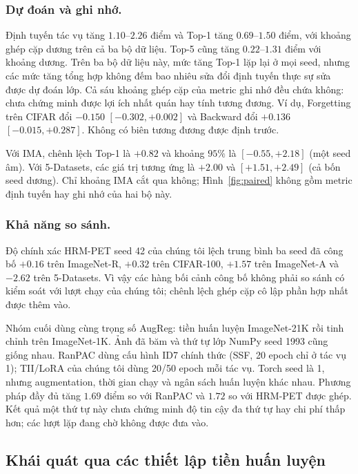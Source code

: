 \documentclass[runningheads]{llncs}
\begin{document}
\subsubsection{Dự đoán và ghi nhớ.}
Định tuyến tác vụ tăng $1.10$--$2.26$ điểm và Top-1 tăng
$0.69$--$1.50$ điểm, với khoảng ghép cặp dương trên cả ba bộ dữ liệu. Top-5
cũng tăng $0.22$--$1.31$ điểm với khoảng dương. Trên ba bộ dữ liệu này, mức
tăng Top-1 lặp lại ở mọi seed, nhưng các mức tăng tổng hợp không đếm bao nhiêu
sửa đổi định tuyến thực sự sửa được dự đoán lớp. Cả sáu khoảng ghép cặp của
metric ghi nhớ đều chứa không: chưa chứng minh được lợi ích nhất quán hay tính
tương đương. Ví dụ, Forgetting trên CIFAR đổi $-0.150$ $[-0.302,+0.002]$ và
Backward đổi $+0.136$ $[-0.015,+0.287]$. Không có biên tương đương được định trước.

Với IMA, chênh lệch Top-1 là $+0.82$ và khoảng $95\%$ là
$[-0.55,+2.18]$ (một seed âm). Với 5-Datasets, các giá trị tương ứng là
$+2.00$ và $[+1.51,+2.49]$ (cả bốn seed dương). Chỉ khoảng IMA cắt qua không;
Hình~\ref{fig:paired} không gồm metric định tuyến hay ghi nhớ của hai bộ này.

\subsubsection{Khả năng so sánh.}
Độ chính xác HRM-PET seed 42 của chúng tôi lệch trung bình ba seed đã công bố
$+0.16$ trên ImageNet-R, $+0.32$ trên CIFAR-100, $+1.57$ trên ImageNet-A và
$-2.62$ trên 5-Datasets. Vì vậy các hàng bối cảnh công bố không phải so sánh
có kiểm soát với lượt chạy của chúng tôi; chênh lệch ghép cặp cô lập phần hợp
nhất được thêm vào.

Nhóm cuối dùng cùng trọng số AugReg: tiền huấn luyện ImageNet-21K rồi tinh
chỉnh trên ImageNet-1K. Ảnh đã băm và thứ tự lớp NumPy seed 1993 cũng giống
nhau. RanPAC dùng cấu hình ID7 chính thức
(SSF, 20 epoch chỉ ở tác vụ 1); TII/LoRA của chúng tôi dùng 20/50 epoch mỗi tác
vụ. Torch seed là 1, nhưng augmentation, thời gian chạy và ngân sách huấn luyện
khác nhau. Phương pháp đầy đủ tăng $1.69$ điểm so với RanPAC và $1.72$ so với
HRM-PET được ghép. Kết quả một thứ tự này chưa chứng minh độ tin cậy đa thứ tự
hay chi phí thấp hơn; các lượt lặp đang chờ không được đưa vào.

\subsection{Khái quát qua các thiết lập tiền huấn luyện}
\label{sec:grid}
\end{document}
